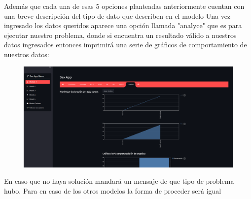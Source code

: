 \documentclass{llncs}
\begin{document}
Además que cada una de esas 5 opciones planteadas anteriormente cuentan con una breve descripción del tipo de dato que describen en el modelo
\newline
\newline
Una vez ingresado los datos queridos aparece una opción llamada "analyce" que es para ejecutar nuestro problema, donde si encuentra un resultado válido a nuestros datos ingresados entonces imprimirá una serie de gráficos de comportamiento de nuestros datos:

\begin{figure}
	\centering
	\includegraphics[width=0.7\linewidth]{Imagenes/aplicacion/modelo1analizar}
	\label{fig:modelo1analizar}
\end{figure}

En caso que no haya solución mandará un mensaje de que tipo de problema hubo.
\newline
\newline
Para en caso de los otros modelos la forma de proceder será igual

\newpage
\end{document}
